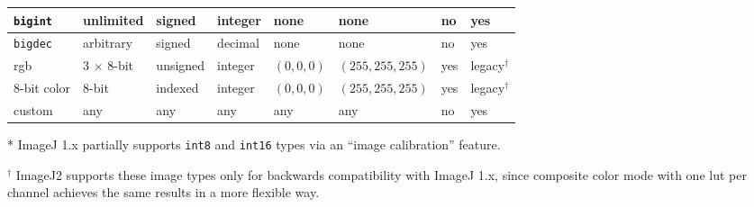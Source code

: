 \documentclass{bmcart}
\begin{document}
\begin{backmatter}
\begin{table}[h!]
\begin{tabular}{| l | l | l | p{0.4in} | p{0.8in} | p{0.8in} | l | l |}
      \texttt{bigint}      & unlimited          & signed              & integer         & none                    & none                   & no                  & yes              \\ \hline
      \texttt{bigdec}      & arbitrary          & signed              & decimal         & none                    & none                   & no                  & yes              \\ \hline
      \acrshort{rgb}       & 3 $\times$ 8-bit   & unsigned            & integer         & $(0, 0, 0)$             & $(255, 255, 255)$      & yes                 & legacy$^\dagger$ \\ \hline
      8-bit color          & 8-bit              & indexed             & integer         & $(0, 0, 0)$             & $(255, 255, 255)$      & yes                 & legacy$^\dagger$ \\ \hline
      custom               & any                & any                 & any             & any                     & any                    & no                  & yes              \\ \hline
    \end{tabular}
    \begin{flushleft}
      * ImageJ 1.x partially supports \texttt{int8} and \texttt{int16} types
      via an ``image calibration'' feature.

      $^\dagger$ ImageJ2 supports these image types only for backwards
      compatibility with ImageJ 1.x, since composite color mode with one
      \acrshort{lut} per channel achieves the same results in a more flexible
      way.
    \end{flushleft}
  \end{table}

\end{backmatter}
\end{document}
